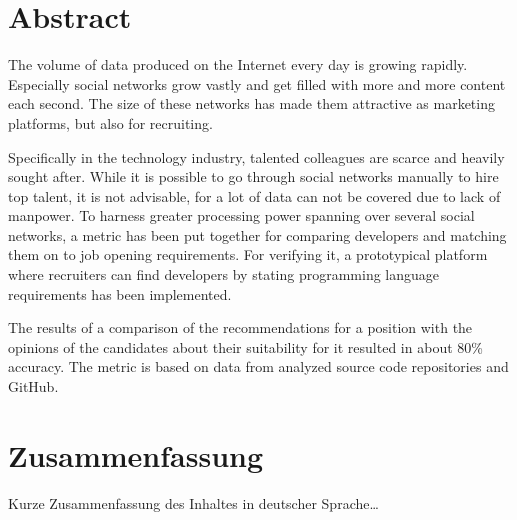 \begingroup
\let\clearpage\relax
\let\cleardoublepage\relax
\let\cleardoublepage\relax

\chapter*{Abstract}
The volume of data produced on the Internet every day is growing rapidly. Especially social networks grow vastly and get filled with more and more content each second. The size of these networks has made them attractive as marketing platforms, but also for recruiting.

Specifically in the technology industry, talented colleagues are scarce and heavily sought after. While it is possible to go through social networks manually to hire top talent, it is not advisable, for a lot of data can not be covered due to lack of manpower. To harness greater processing power spanning over several social networks, a metric has been put together for comparing developers and matching them on to job opening requirements. For verifying it, a prototypical platform where recruiters can find developers by stating programming language requirements has been implemented.

The results of a comparison of the recommendations for a position with the opinions of the candidates about their suitability for it resulted in about 80\% accuracy. The metric is based on data from analyzed source code repositories and GitHub.


\vfill

\chapter*{Zusammenfassung}
Kurze Zusammenfassung des Inhaltes in deutscher Sprache\dots


\endgroup

\vfill